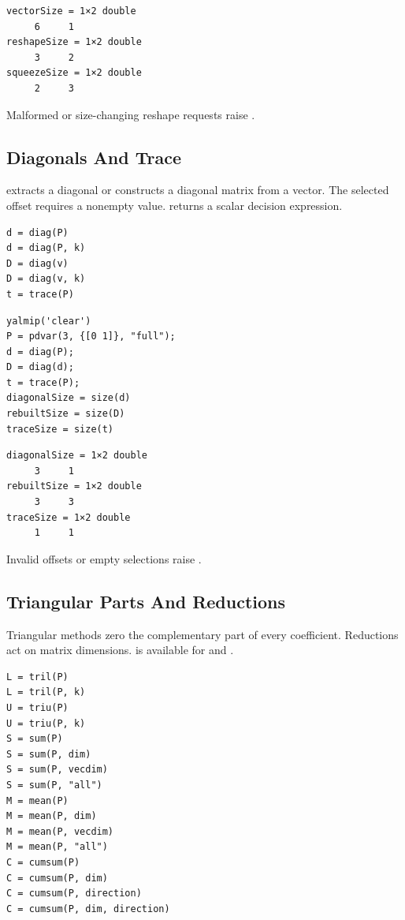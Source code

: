 \begin{lstlisting}[style=dpoutput]
vectorSize = 1×2 double
     6     1
reshapeSize = 1×2 double
     3     2
squeezeSize = 1×2 double
     2     3
\end{lstlisting}

Malformed or size-changing reshape requests raise .

\subsection{Diagonals And Trace}

 extracts a diagonal or constructs a diagonal matrix from a vector. The selected offset requires a nonempty value.  returns a scalar decision expression.

\syntaxhead
\begin{lstlisting}[style=dpsyntax]
d = diag(P)
d = diag(P, k)
D = diag(v)
D = diag(v, k)
t = trace(P)
\end{lstlisting}

\examplehead
\begin{lstlisting}[style=dpmatlab]
yalmip('clear')
P = pdvar(3, {[0 1]}, "full");
d = diag(P);
D = diag(d);
t = trace(P);
diagonalSize = size(d)
rebuiltSize = size(D)
traceSize = size(t)
\end{lstlisting}

\begin{lstlisting}[style=dpoutput]
diagonalSize = 1×2 double
     3     1
rebuiltSize = 1×2 double
     3     3
traceSize = 1×2 double
     1     1
\end{lstlisting}

Invalid offsets or empty selections raise .

\subsection{Triangular Parts And Reductions}
\label{sec:pdvar-matrix-reductions}

Triangular methods zero the complementary part of every coefficient. Reductions act on matrix dimensions.  is available for  and .

\syntaxhead
\begin{lstlisting}[style=dpsyntax]
L = tril(P)
L = tril(P, k)
U = triu(P)
U = triu(P, k)
S = sum(P)
S = sum(P, dim)
S = sum(P, vecdim)
S = sum(P, "all")
M = mean(P)
M = mean(P, dim)
M = mean(P, vecdim)
M = mean(P, "all")
C = cumsum(P)
C = cumsum(P, dim)
C = cumsum(P, direction)
C = cumsum(P, dim, direction)
\end{lstlisting}

